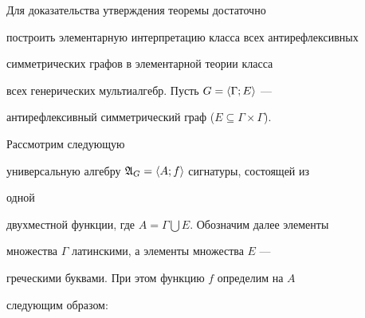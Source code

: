  


Для доказательства утверждения теоремы достаточно 


построить элементарную интерпретацию класса всех антирефлексивных 


симметрических графов в элементарной теории класса 


всех генерических мультиалгебр. Пусть $G=\langle\Gamma;E\rangle$ --- 


антирефлексивный симметрический граф ($E\subseteq\Gamma\times\Gamma$). 


Рассмотрим следующую 


универсальную алгебру $\frak A_G=\langle A;f\rangle$ сигнатуры, состоящей из 


одной 


двухместной функции, где $A=\Gamma\bigcup E$. Обозначим далее элементы 


множества $\Gamma$ латинскими, а элементы множества $E$ --- 


греческими буквами. При этом функцию $f$ определим на $A$ 


следующим образом: 


